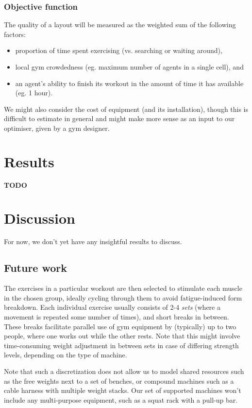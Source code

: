 \documentclass[9pt]{pnas-new}
\begin{document}
\subsubsection*{Objective function}

The quality of a layout will be measured as the weighted sum of the following factors: 
\begin{itemize}
	\item proportion of time spent exercising (vs. searching or waiting around),
	\item local gym crowdedness (eg. maximum number of agents in a single cell), and
	\item an agent's ability to finish its workout in the amount of time it has available (eg. 1 hour).
\end{itemize}
We might also consider the cost of equipment (and its installation), though this is difficult to estimate in general and might make more sense as an input to our optimiser, given by a gym designer.


\section*{Results}
\textbf{TODO} %


\section*{Discussion}

For now, we don't yet have any insightful results to discuss.

\subsection*{Future work} 

The exercises in a particular workout are then selected to stimulate each muscle in the chosen group, ideally cycling through them to avoid fatigue-induced form breakdown. Each individual exercise usually consists of 2-4 {\it sets} (where a movement is repeated some number of times), and short breaks in between. These breaks facilitate parallel use of gym equipment by (typically) up to two people, where one works out while the other rests. Note that this might involve time-consuming weight adjustment in between sets in case of differing strength levels, depending on the type of machine.

Note that such a discretization does not allow us to model shared resources such as the free weights next to a set of benches, or compound machines such as a cable harness with multiple weight stacks.
Our set of supported machines won't include any multi-purpose equipment, such as a squat rack with a pull-up bar.
\end{document}
